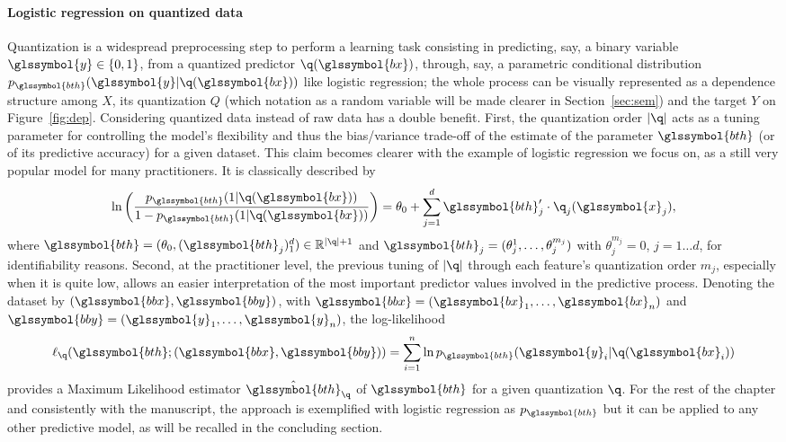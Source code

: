 \paragraph{Logistic regression on quantized data}

Quantization is a widespread preprocessing step to perform a learning task consisting in predicting, say, a binary variable $\glssymbol{y}\in\{0,1\}$, from a quantized predictor  $\q(\glssymbol{bx})$, through, say, a parametric conditional distribution $p_{\glssymbol{bth}}(\glssymbol{y}|\q(\glssymbol{bx}))$ like logistic regression; the whole process can be visually represented as a dependence structure among $X$, its quantization $Q$ (which notation as a random variable will be made clearer in Section~\ref{sec:sem}) and the target $Y$ on Figure~\ref{fig:dep}. Considering quantized data instead of raw data has a double benefit. First, the quantization order $|\q|$ acts as a tuning parameter for controlling the model's flexibility and thus the bias/variance trade-off of the estimate of the parameter $\glssymbol{bth}$ (or of its predictive accuracy) for a given dataset. This claim becomes clearer with the example of logistic regression we focus on, as a still very popular model for many practitioners. It is classically described by
\begin{equation}
    \label{eq:reglogq}
\ln \left( \dfrac{p_{\glssymbol{bth}}(1|\q(\glssymbol{bx}))}{1 - p_{\glssymbol{bth}}(1|\q(\glssymbol{bx}))} \right) = \theta_0 + \sum_{j=1}^d \glssymbol{bth}_j' \cdot \q_j(\glssymbol{x}_j),
\end{equation}
where $\glssymbol{bth} = (\theta_{0},(\glssymbol{bth}_j)_1^d) \in \mathbb{R}^{|\q|+1}$ and $\glssymbol{bth}_j = (\theta_{j}^{1},\dots,\theta_{j}^{m_j})$ with $\theta_{j}^{m_j} = 0$, $j=1 \ldots d$, for identifiability reasons.
Second, at the practitioner level, the previous tuning of $|\q|$ through each feature's quantization order $m_j$, especially when it is quite low, allows an easier interpretation of the most important predictor values involved in the predictive process. Denoting the dataset by $(\glssymbol{bbx},\glssymbol{bby})$, with $\glssymbol{bbx}=(\glssymbol{bx}_1,\ldots,\glssymbol{bx}_n)$ and $\glssymbol{bby}=(\glssymbol{y}_1,\ldots,\glssymbol{y}_n)$, the log-likelihood 
\begin{equation}
\label{eq:lq}
\ell_{\q}(\glssymbol{bth} ; (\glssymbol{bbx},\glssymbol{bby}))=\sum_{i=1}^n \ln p_{\glssymbol{bth}}(\glssymbol{y}_i|\q(\glssymbol{bx}_i))
\end{equation}
provides a Maximum Likelihood estimator $\hat{\glssymbol{bth}}_\q$ of $\glssymbol{bth}$ for a given quantization $\q$. For the rest of the chapter and consistently with the manuscript, the approach is exemplified with logistic regression as $p_{\glssymbol{bth}}$ but it can be applied to any other predictive model, as will be recalled in the concluding section.


